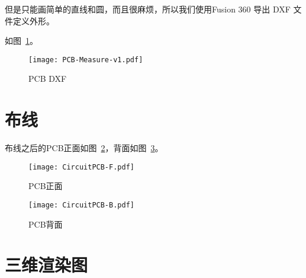 但是只能画简单的直线和圆，而且很麻烦，所以我们使用Fusion 360 导出 DXF 文件定义外形。

如图~\ref{fig:PCB-Measure-v1}。

\begin{figure}[htbp]
    \centering
    \texttt{[image: PCB-Measure-v1.pdf]}
    \caption{PCB DXF}
    \label{fig:PCB-Measure-v1}
\end{figure}


\section{布线}








布线之后的PCB正面如图~\ref{fig:CircuitPCB-F}，背面如图~\ref{fig:CircuitPCB-B}。

\begin{figure}[htbp]
    \centering
    \texttt{[image: CircuitPCB-F.pdf]}
    \caption{PCB正面}
    \label{fig:CircuitPCB-F}
\end{figure}

\begin{figure}[htbp]
    \centering
    \texttt{[image: CircuitPCB-B.pdf]}
    \caption{PCB背面}
    \label{fig:CircuitPCB-B}
\end{figure}

\section{三维渲染图}


